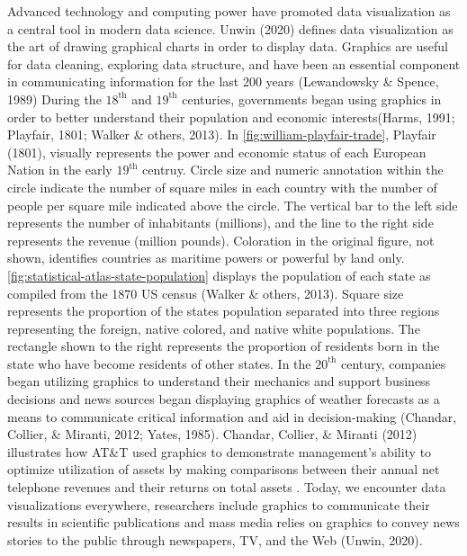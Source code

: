 \documentclass[print]{nuthesis}
\begin{document}
Advanced technology and computing power have promoted data visualization as a central tool in modern data science. Unwin (2020) defines data visualization as the art of drawing graphical charts in order to display data.
Graphics are useful for data cleaning, exploring data structure, and have been an essential component in communicating information for the last 200 years (Lewandowsky \& Spence, 1989)
During the \(\text{18}^{\text{th}}\) and \(\text{19}^{\text{th}}\) centuries, governments began using graphics in order to better understand their population and economic interests(Harms, 1991; Playfair, 1801; Walker \& others, 2013).
In \cref{fig:william-playfair-trade}, Playfair (1801), visually represents the power and economic status of each European Nation in the early \(\text{19}^{\text{th}}\) centruy.
Circle size and numeric annotation within the circle indicate the number of square miles in each country with the number of people per square mile indicated above the circle.
The vertical bar to the left side represents the number of inhabitants (millions), and the line to the right side represents the revenue (million pounds).
Coloration in the original figure, not shown, identifies countries as maritime powers or powerful by land only.
\cref{fig:statistical-atlas-state-population} displays the population of each state as compiled from the 1870 US census (Walker \& others, 2013).
Square size represents the proportion of the states population separated into three regions representing the foreign, native colored, and native white populations.
The rectangle shown to the right represents the proportion of residents born in the state who have become residents of other states.
In the \(\text{20}^{\text{th}}\) century, companies began utilizing graphics to understand their mechanics and support business decisions and news sources began displaying graphics of weather forecasts as a means to communicate critical information and aid in decision-making (Chandar, Collier, \& Miranti, 2012; Yates, 1985).
Chandar, Collier, \& Miranti (2012) illustrates how AT\&T used graphics to demonstrate management's ability to optimize utilization of assets by making comparisons between their annual net telephone revenues and their returns on total assets .
Today, we encounter data visualizations everywhere, researchers include graphics to communicate their results in scientific publications and mass media relies on graphics to convey news stories to the public through newspapers, TV, and the Web (Unwin, 2020).
\end{document}
